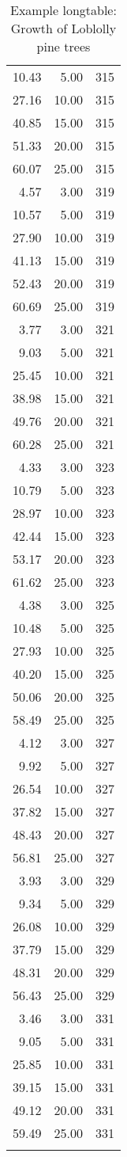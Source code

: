 \documentclass[10pt, fullpage, a4paper, titlepage]{article}
\begin{document}
\begin{longtable}{rrl}
  10.43 & 5.00 & 315 \\ 
  27.16 & 10.00 & 315 \\ 
  40.85 & 15.00 & 315 \\ 
  51.33 & 20.00 & 315 \\ 
  60.07 & 25.00 & 315 \\ 
  4.57 & 3.00 & 319 \\ 
  10.57 & 5.00 & 319 \\ 
  27.90 & 10.00 & 319 \\ 
  41.13 & 15.00 & 319 \\ 
  52.43 & 20.00 & 319 \\ 
  60.69 & 25.00 & 319 \\ 
  3.77 & 3.00 & 321 \\ 
  9.03 & 5.00 & 321 \\ 
  25.45 & 10.00 & 321 \\ 
  38.98 & 15.00 & 321 \\ 
  49.76 & 20.00 & 321 \\ 
  60.28 & 25.00 & 321 \\ 
  4.33 & 3.00 & 323 \\ 
  10.79 & 5.00 & 323 \\ 
  28.97 & 10.00 & 323 \\ 
  42.44 & 15.00 & 323 \\ 
  53.17 & 20.00 & 323 \\ 
  61.62 & 25.00 & 323 \\ 
  4.38 & 3.00 & 325 \\ 
  10.48 & 5.00 & 325 \\ 
  27.93 & 10.00 & 325 \\ 
  40.20 & 15.00 & 325 \\ 
  50.06 & 20.00 & 325 \\ 
  58.49 & 25.00 & 325 \\ 
  4.12 & 3.00 & 327 \\ 
  9.92 & 5.00 & 327 \\ 
  26.54 & 10.00 & 327 \\ 
  37.82 & 15.00 & 327 \\ 
  48.43 & 20.00 & 327 \\ 
  56.81 & 25.00 & 327 \\ 
  3.93 & 3.00 & 329 \\ 
  9.34 & 5.00 & 329 \\ 
  26.08 & 10.00 & 329 \\ 
  37.79 & 15.00 & 329 \\ 
  48.31 & 20.00 & 329 \\ 
  56.43 & 25.00 & 329 \\ 
  3.46 & 3.00 & 331 \\ 
  9.05 & 5.00 & 331 \\ 
  25.85 & 10.00 & 331 \\ 
  39.15 & 15.00 & 331 \\ 
  49.12 & 20.00 & 331 \\ 
  59.49 & 25.00 & 331 \\ 
   \hline
\hline
\caption{Example longtable: Growth of Loblolly pine trees} 
\label{APlongtable}
\end{longtable}
\end{document}
